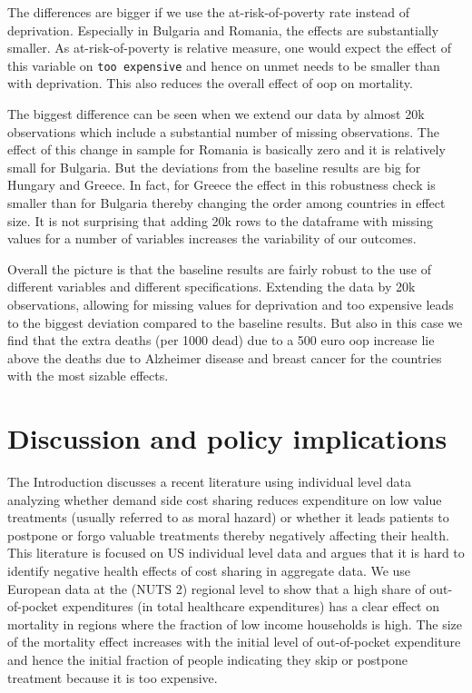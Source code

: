 \documentclass[a4paper,12pt]{article}
\begin{document}
The differences are bigger if we use the at-risk-of-poverty rate instead of deprivation. Especially in Bulgaria and Romania, the effects are substantially smaller. As at-risk-of-poverty is relative measure, one would expect the effect of this variable on \texttt{too expensive} and hence on unmet needs to be smaller than with deprivation. This also reduces the overall effect of oop on mortality.

The biggest difference can be seen when we extend our data by almost 20k observations which include a substantial number of missing observations. The effect of this change in sample for Romania is basically zero and it is relatively small for Bulgaria. But the deviations from the baseline results are big for Hungary and Greece. In fact, for Greece the effect in this robustness check is smaller than for Bulgaria thereby changing the order among countries in effect size. It is not surprising that adding 20k rows to the dataframe with missing values for a number of variables increases the variability of our outcomes.

Overall the picture is that the baseline results are fairly robust to the use of different variables and different specifications. Extending the data by 20k observations, allowing for missing values for deprivation and too expensive leads to the biggest deviation compared to the baseline results. But also in this case we find that the extra deaths (per 1000 dead) due to a 500 euro oop increase lie above the deaths due to Alzheimer disease and breast cancer for the countries with the most sizable effects.

\section{Discussion and policy implications}
\label{sec:orgc6498fc}

The Introduction discusses a recent literature using individual level data analyzing whether demand side cost sharing reduces expenditure on low value treatments (usually referred to as moral hazard) or whether it leads patients to postpone or forgo valuable treatments thereby negatively affecting their health. This literature is focused on US individual level data and argues that it is hard to identify negative health effects of cost sharing in aggregate data. We use European data at the (NUTS 2) regional level to show that a high share of out-of-pocket expenditures (in total healthcare expenditures) has a clear effect on mortality in regions where the fraction of low income households is high. The size of the mortality effect increases with the initial level of out-of-pocket expenditure and hence the initial fraction of people indicating they skip or postpone treatment because it is too expensive.
\end{document}

